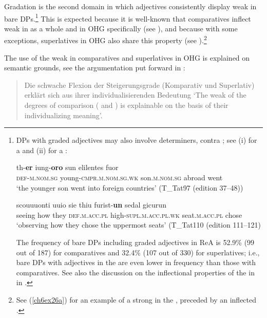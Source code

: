 \documentclass[output=paper,colorlinks,citecolor=brown]{langscibook}
\begin{document}
Gradation is the second domain in which adjectives consistently display
weak  in bare DPs.\footnote{DPs with
  graded adjectives may also involve determiners, contra \citet[69--70]{Demske01}; see (i) for a
   and (ii) for a :
  
\begin{exe}
\gll  th-\textbf{er} iung-\textbf{oro} sun elilentes fuor\\
\textsc{def-m.nom.sg} young-\textsc{cmpr.m.nom.sg.wk} son.\textsc{m.nom.sg} abroad went\\
\glt `the younger son went into foreign countries' (T\_Tat97 (edition 37--48))

\gll scouuuonti uuio sie thiu furist-\textbf{un} sedal gicurun\\
seeing how they \textsc{def.m.acc.pl} high-\textsc{supl.m.acc.pl.wk} seat.\textsc{m.acc.pl} chose\\
\glt `observing how they chose the uppermost seats' (T\_Tat110 (edition 111--121)
\end{exe}

  \noindent The frequency of bare DPs including graded adjectives in ReA is 52.9\%
  (99 out of 187) for comparatives and 32.4\% (107 out of 330) for
  superlatives; i.e., bare DPs with adjectives in the  are
  even lower in frequency than those with comparatives. See also the discussion on the inflectional properties of the
   in  in \citet[173--175]{behaghel1923deutsche}.} This
is expected because it is well-known that comparatives inflect weak in
 as a whole and in OHG specifically (see \citealp[172, \emph{inter alia}]{behaghel1923deutsche}), and because with some exceptions, superlatives in
OHG also share this property (see \citealp[315]{Braune2018AHD}).\footnote{See (\ref{ch6ex26a}) for an example of a strong  in the , preceded by an inflected .}

The use of the weak  in comparatives and superlatives in OHG
is explained on semantic grounds, see the argumentation put forward in \citet[314]{Braune2018AHD}:

\begin{quote}
Die schwache Flexion der Steigerungsgrade (Komparativ und Superlativ)
erklärt sich aus ihrer individualisierenden Bedeutung
\glt `The weak  of the degrees of comparison ( 
and ) is explainable on the basis of their individualizing meaning'.
\end{quote}
\end{document}
